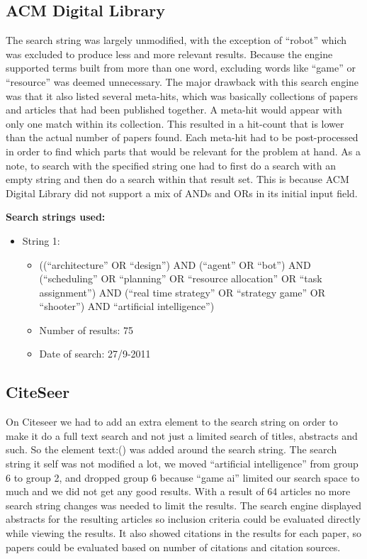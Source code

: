 \subsection{ACM Digital Library}
\label{sub:acm_digital_library}
The search string was largely unmodified, with the exception of ``robot'' which was excluded to produce less and more relevant results. Because the engine supported terms built from more than one word, excluding words like ``game'' or ``resource'' was deemed unnecessary. The major drawback with this search engine was that it also listed several meta-hits, which was basically collections of papers and articles that had been published together. A meta-hit would appear with only one match within its collection. This resulted in a hit-count that is lower than the actual number of papers found. Each meta-hit had to be post-processed in order to find which parts that would be relevant for the problem at hand. As a note, to search with the specified string one had to first do a search with an empty string and then do a search within that result set. This is because ACM Digital Library did not support a mix of ANDs and ORs in its initial input field.

\textbf{Search strings used:}
\begin{itemize}
\item String 1:
\begin{itemize}
\item ((``architecture'' OR ``design'') AND (``agent'' OR ``bot'') AND (\newline``scheduling'' OR ``planning'' OR ``resource allocation'' OR ``task assignment'') AND (``real time strategy'' OR ``strategy game'' OR ``shooter'') AND ``artificial intelligence'')
\item Number of results: 75
\item Date of search: 27/9-2011
\end{itemize}
\end{itemize}

\subsection{CiteSeer}
\label{sub:citeseer}
On Citeseer we had to add an extra element to the search string on order to make it do a full text search and not just a limited search of titles, abstracts and such. So the element text:() was added around the search string. The search string it self was not modified a lot, we moved ``artificial intelligence'' from group 6 to group 2, and dropped group 6 because ``game ai'' limited our search space to much and we did not get any good results.  With a result of 64 articles no more search string changes was needed to limit the results. 
The search engine displayed abstracts for the resulting articles so inclusion criteria could be evaluated directly while viewing the results. It also showed citations in the results for each paper, so papers could be evaluated based on number of citations and citation sources. 

